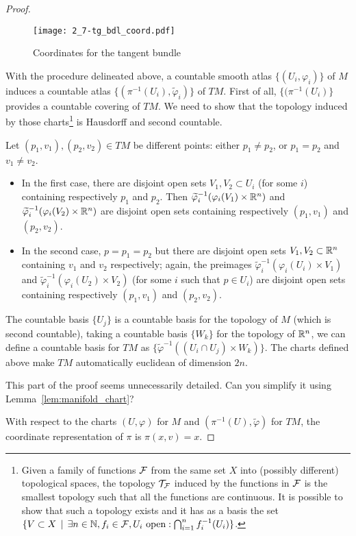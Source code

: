 \begin{proof}
  \begin{figure*}[htp]
    \texttt{[image: 2\_7-tg\_bdl\_coord.pdf]}
    \caption{Coordinates for the tangent bundle}
  \end{figure*}

  With the procedure delineated above, a countable smooth atlas $\{(U_i, \varphi_i)\}$ of $M$ induces a countable atlas $\{(\pi^{-1}(U_i), \widetilde\varphi_i)\}$ of $TM$.
  First of all, $\{(\pi^{-1}(U_i)\}$ provides a countable covering of $TM$.
  We need to show that the topology induced by those charts\footnote{Given a family of functions $\mathcal{F}$ from the same set $X$ into (possibly different) topological spaces, the topology $\mathcal{T}_{\mathcal{F}}$ induced by the functions in $\mathcal{F}$ is the smallest topology such that all the functions are continuous. It is possible to show that such a topology exists and it has as a basis the set $\{V\subset X \,\mid\, \exists n\in\mathbb{N}, f_i\in\mathcal{F}, U_i \mbox{ open} : \bigcap_{i=1}^n f_i^{-1}(U_i) \}$.} is Hausdorff and second countable.

  Let $(p_1, v_1), (p_2, v_2) \in TM$ be different points: either $p_1\neq p_2$, or $p_1 = p_2$ and $v_1 \neq v_2$.
  \begin{itemize}
    \item In the first case, there are disjoint open sets $V_1, V_2 \subset U_i$ (for some $i$) containing respectively $p_1$ and $p_2$.
          Then $\widetilde\varphi_i^{-1}(\varphi_i(V_1)\times\mathbb{R}^n)$ and $\widetilde\varphi_i^{-1}(\varphi_i(V_2)\times\mathbb{R}^n)$ are disjoint open sets containing respectively $(p_1, v_1)$ and $(p_2, v_2)$.
    \item In the second case, $p=p_1=p_2$ but there are disjoint open sets $V_1,V_2\subset \mathbb{R}^n$ containing $v_1$ and $v_2$ respectively;
          again, the preimages $\widetilde\varphi_i^{-1}(\varphi_i(U_i)\times V_1)$ and $\widetilde\varphi_i^{-1}(\varphi_i(U_2)\times V_2)$ (for some $i$ such that $p\in U_i$) are disjoint open sets containing respectively $(p_1, v_1)$ and $(p_2, v_2)$.
  \end{itemize}

  The countable basis $\{U_j\}$ is a countable basis for the topology of $M$ (which is second countable), taking a countable basis $\{W_k\}$ for the topology of $\mathbb{R}^n$, we can define a countable basis for $TM$ as $\{\widetilde\varphi^{-1}((U_i\cap U_j)\times W_k)\}$.
  The charts defined above make $TM$ automatically euclidean of dimension $2n$.

  \begin{exercise}
    This part of the proof seems unnecessarily detailed.
    Can you simplify it using Lemma~\ref{lem:manifold_chart}?
  \end{exercise}

   With respect to the charts $(U,\varphi)$ for $M$ and $(\pi^{-1}(U), \widetilde\varphi)$ for $TM$, the coordinate representation of $\pi$ is $\pi(x,v) = x$.
\end{proof}

